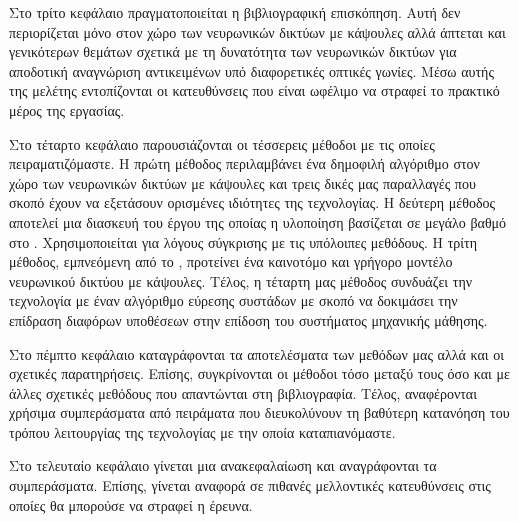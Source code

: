 Στο τρίτο κεφάλαιο πραγματοποιείται η βιβλιογραφική επισκόπηση. Αυτή δεν περιορίζεται μόνο στον χώρο των νευρωνικών δικτύων με κάψουλες αλλά άπτεται και γενικότερων θεμάτων σχετικά με τη δυνατότητα των νευρωνικών δικτύων για αποδοτική αναγνώριση αντικειμένων υπό διαφορετικές οπτικές γωνίες. Μέσω αυτής της μελέτης εντοπίζονται οι κατευθύνσεις που είναι ωφέλιμο να στραφεί το πρακτικό μέρος της εργασίας.\par

Στο τέταρτο κεφάλαιο παρουσιάζονται οι τέσσερεις μέθοδοι με τις οποίες πειραματιζόμαστε. Η πρώτη μέθοδος περιλαμβάνει ένα δημοφιλή αλγόριθμο στον χώρο των νευρωνικών δικτύων με κάψουλες και τρεις δικές μας παραλλαγές που σκοπό έχουν να εξετάσουν ορισμένες ιδιότητες της τεχνολογίας. Η δεύτερη μέθοδος αποτελεί μια διασκευή του έργου \cite{hinton2018matrix} της οποίας η υλοποίηση βασίζεται σε μεγάλο βαθμό στο \cite{gritzman2019avoiding}. Χρησιμοποιείται για λόγους σύγκρισης με τις υπόλοιπες μεθόδους. Η τρίτη μέθοδος, εμπνεόμενη από το \cite{mazzia2021efficient}, προτείνει ένα καινοτόμο και γρήγορο μοντέλο νευρωνικού δικτύου με κάψουλες. Τέλος, η τέταρτη μας μέθοδος συνδυάζει την τεχνολογία με έναν αλγόριθμο εύρεσης συστάδων με σκοπό να δοκιμάσει την επίδραση διαφόρων υποθέσεων στην επίδοση του συστήματος μηχανικής μάθησης.\par

Στο πέμπτο κεφάλαιο καταγράφονται τα αποτελέσματα των μεθόδων μας αλλά και οι σχετικές παρατηρήσεις. Επίσης, συγκρίνονται οι μέθοδοι τόσο μεταξύ τους όσο και με άλλες σχετικές μεθόδους που απαντώνται στη βιβλιογραφία. Τέλος, αναφέρονται χρήσιμα συμπεράσματα από πειράματα που διευκολύνουν τη βαθύτερη κατανόηση του τρόπου λειτουργίας της τεχνολογίας με την οποία καταπιανόμαστε.\par

Στο τελευταίο κεφάλαιο γίνεται μια ανακεφαλαίωση και αναγράφονται τα συμπεράσματα. Επίσης, γίνεται αναφορά σε πιθανές μελλοντικές κατευθύνσεις στις οποίες θα μπορούσε να στραφεί η έρευνα. 